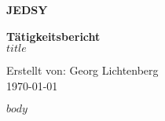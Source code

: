 \documentclass[a4paper]{article}
\newcommand{\jedsyname}{%
  \textcolor{jedsy}{%
    \fontsize{20}{24}\selectfont\textbf{JEDSY}}%
}
\begin{document}
\begin{titlepage}
    \centering
    \vspace*{2cm}
    
    \jedsyname
    
    \vspace{1.5cm}
    {\huge \textbf{Tätigkeitsbericht}}\\
    \vspace{0.5cm}
    {\Large $title$}\\
    \vspace{1cm}
    
    \vfill
    
    {\large Erstellt von: Georg Lichtenberg}\\
    {\large \today}
    
\end{titlepage}

\tableofcontents
\newpage

$body$
\end{document}
